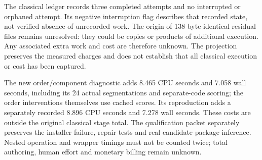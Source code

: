 The classical ledger records three completed attempts and no interrupted or orphaned attempt. Its negative interruption flag describes that recorded state, not verified absence of unrecorded work. The origin of 138 byte-identical residual files remains unresolved: they could be copies or products of additional execution. Any associated extra work and cost are therefore unknown. The projection preserves the measured charges and does not establish that all classical execution or cost has been captured.

The new order/component diagnostic adds 8.465 CPU seconds and 7.058 wall seconds, including its 24 actual segmentations and separate-code scoring; the order interventions themselves use cached scores. Its reproduction adds a separately recorded 8.896 CPU seconds and 7.278 wall seconds. These costs are outside the original classical stage total. The qualification packet separately preserves the installer failure, repair tests and real candidate-package inference. Nested operation and wrapper timings must not be counted twice; total authoring, human effort and monetary billing remain unknown.
